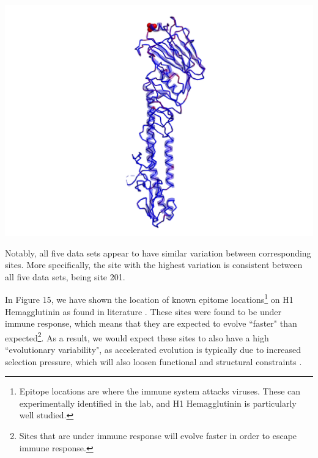 \documentclass[12pt]{article}
\newenvironment{Figure}
  {\par\medskip\noindent\minipage{\linewidth}}
  {\endminipage\par\medskip}
\begin{document}
\begin{multicols}{2}
\begin{Figure}
 \includegraphics[width=\linewidth]{subsample_4_viewA.png}
\end{Figure}

Notably, all five data sets appear to have similar variation between corresponding sites. More specifically, the site with the highest variation is consistent between all five data sets, being site 201.

In Figure 15, we have shown the location of known epitome locations\footnote{Epitope locations are where the immune system attacks viruses. These can experimentally identified in the lab, and H1 Hemagglutinin is particularly well studied.} on H1 Hemagglutinin as found in literature \citep{caton1982antigenic}. These sites were found to be under immune response, which means that they are expected to evolve ``faster" than expected\footnote{Sites that are under immune response will evolve faster in order to escape immune response.}. As a result, we would expect these sites to also have a high ``evolutionary variability", as accelerated evolution is typically due to increased selection pressure, which will also loosen functional and structural constraints \citep{wiley1987structure}.


\end{multicols}
\end{document}
